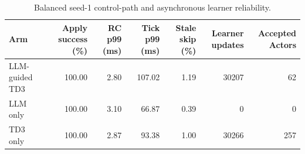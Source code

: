 \begin{table}[t]
\centering
\caption{Balanced seed-1 control-path and asynchronous learner reliability.}
\label{tab:pilot-control}
\begin{tabular}{lrrrrrr}
\toprule
Arm & Apply success (\%) & RC p99 (ms) & Tick p99 (ms) & Stale skip (\%) & Learner updates & Accepted Actors\\
\midrule
LLM-guided TD3 & 100.00 & 2.80 & 107.02 & 1.19 & 30207 & 62 \\
LLM only & 100.00 & 3.10 & 66.87 & 0.39 & 0 & 0 \\
TD3 only & 100.00 & 2.87 & 93.38 & 1.00 & 30266 & 257 \\
\bottomrule
\end{tabular}
\end{table}
